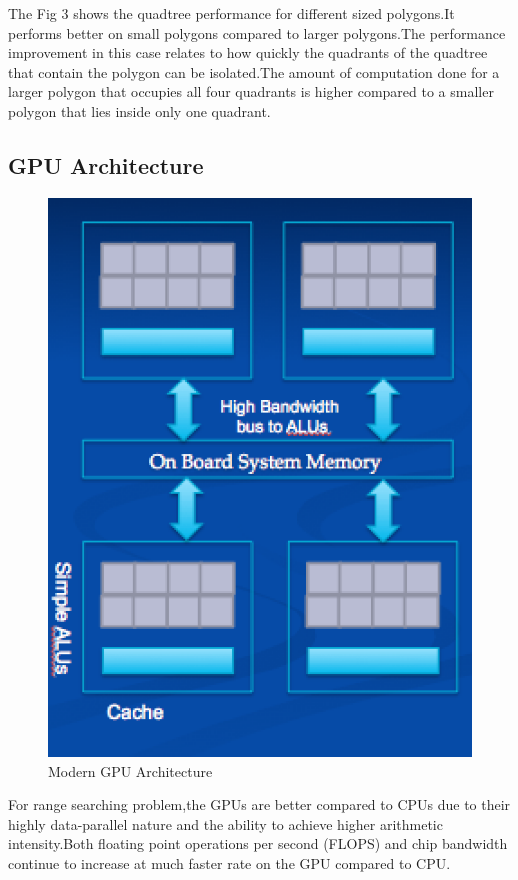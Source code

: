 \documentclass{article}
\begin{document}
The Fig 3 shows the quadtree performance for different sized polygons.It  performs better on small polygons compared to larger polygons.The performance improvement in this case relates to how quickly the quadrants of the quadtree that contain the polygon can be isolated.The amount of computation done for a larger polygon that occupies all four quadrants is higher compared to a smaller polygon that lies inside only one quadrant.



\subsection{GPU Architecture}

 \begin{figure}[H]
 \centering
\includegraphics[scale=0.8]{GPU_Architecture}
\caption{Modern GPU Architecture}
 \end{figure}
 
 

For range searching problem,the GPUs are better compared to CPUs due to their highly data-parallel nature and the ability to achieve higher arithmetic intensity.Both floating point operations per second (FLOPS) and chip bandwidth continue to increase at much faster rate on the GPU compared to CPU.
 
\end{document}
